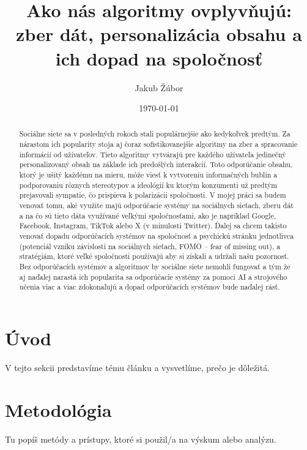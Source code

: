 \documentclass[a4paper,12pt]{article}
\title{Ako nás algoritmy ovplyvňujú: zber dát, personalizácia obsahu a ich dopad na spoločnosť}
\author{Jakub Žúbor}
\date{\today} %
\begin{document}
\maketitle
{}
\begin{abstract}
Sociálne siete sa  v posledných rokoch stali populárnejšie ako kedykoľvek predtým. Za nárastom ich popularity stoja aj čoraz sofistikovanejšie algoritmy na zber a spracovanie informácií od užívateľov. Tieto algoritmy vytvárajú pre každého užívateľa jedinečný personalizovaný obsah na základe ich predošlých interakcií. Toto odporúčanie obsahu, ktorý je ušitý každému na mieru, môže viesť k vytvoreniu informačných bublín a podporovaniu rôznych stereotypov a ideológií ku ktorým konzumenti už predtým prejavovali sympatie, čo prispieva k polarizácii spoločnosti. 
V mojej práci sa budem venovať tomu, aké využite majú odporúčacie systémy na sociálnych sieťach, zberu dát a na čo sú tieto dáta využívané veľkými spoločnosťami, ako je napríklad Google, Facebook, Instagram, TikTok alebo X (v minulosti Twitter). Ďalej sa chcem takisto venovať dopadu odporúčacích systémov na spoločnosť a psychickú stránku jednotlivca (potenciál vzniku závislosti na sociálnych sieťach, FOMO – fear of missing out), a stratégiám, ktoré veľké spoločnosti používajú aby si získali a udržali našu pozornosť.
Bez odporúčacích systémov a algoritmov by sociálne siete nemohli fungovať a tým že aj naďalej narastá ich popularita sa odporúčacie systémy za pomoci AI a strojového učenia viac a viac zdokonaľujú a dopad odporúčacích systémov bude naďalej rásť.

\end{abstract}

\newpage

\section{Úvod}
V tejto sekcii predstavíme tému článku a vysvetlíme, prečo je dôležitá.

\section{Metodológia}
Tu popíš metódy a prístupy, ktoré si použil/a na výskum alebo analýzu.
\end{document}
